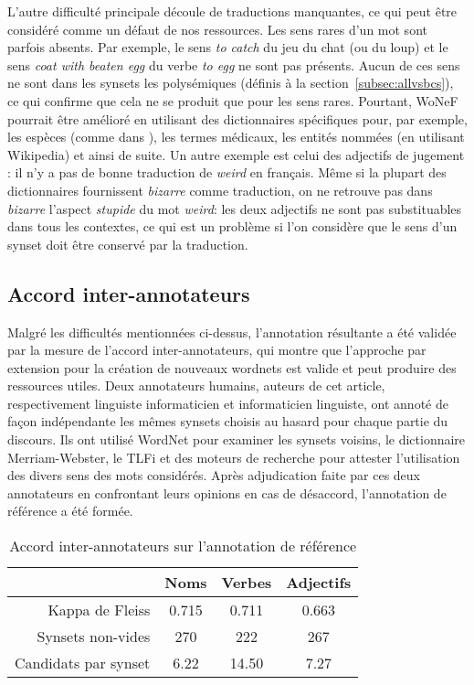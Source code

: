 L'autre difficulté principale découle de traductions manquantes, ce qui peut être considéré comme un défaut de nos ressources. Les sens rares d'un mot sont parfois absents. Par exemple, le sens \textit{to catch} du jeu du chat (ou du loup) et le sens \textit{coat with beaten egg} du verbe \textit{to egg} ne sont pas présents. Aucun de ces sens ne sont dans les synsets les polysémiques (définis à la section~\ref{subsec:allvsbcs}), ce qui confirme que cela ne se produit que pour les sens rares. Pourtant, WoNeF pourrait être amélioré en utilisant des dictionnaires spécifiques pour, par exemple, les espèces (comme dans \cite{sagot2008construction}), les termes médicaux, les entités nommées (en utilisant Wikipedia) et ainsi de suite. Un autre exemple est celui des adjectifs de jugement : il n'y a pas de bonne traduction de \textit{weird} en français. Même si la plupart des dictionnaires fournissent \textit{bizarre} comme traduction, on ne retrouve pas dans \textit{bizarre} l'aspect \textit{stupide} du mot \textit{weird}: les deux adjectifs ne sont pas substituables dans tous les contextes, ce qui est un problème si l'on considère que le sens d'un synset doit être conservé par la traduction.

\subsection{Accord inter-annotateurs}
\label{subsec:interannotator_agreement}

Malgré les difficultés mentionnées ci-dessus, l'annotation résultante a été validée par la mesure de l'accord inter-annotateurs, qui montre que l'approche par extension pour la création de nouveaux wordnets est valide et peut produire des ressources utiles. Deux annotateurs humains, auteurs de cet article, respectivement linguiste informaticien et informaticien linguiste, ont annoté de façon indépendante les mêmes synsets choisis au hasard pour chaque partie du discours. Ils ont utilisé WordNet pour examiner les synsets voisins, le dictionnaire Merriam-Webster, le TLFi \citep{TLFi} et des moteurs de recherche pour attester l'utilisation des divers sens des mots considérés. Après adjudication faite par ces deux annotateurs en confrontant leurs opinions en cas de désaccord, l'annotation de référence a été formée.

\begin{table}[ht]
\centering
\begin{tabular}{rccc}
  \toprule
                        & Noms    & Verbes   & Adjectifs \\
  \midrule
  Kappa de Fleiss        & 0.715   & 0.711   & 0.663    \\
  Synsets non-vides     & 270     & 222     & 267       \\
  Candidats par synset  & 6.22    & 14.50   & 7.27 \\
  \bottomrule
\end{tabular}
\caption{\protect\centering\label{table:kappa}Accord inter-annotateurs sur l'annotation de référence}
\end{table}

